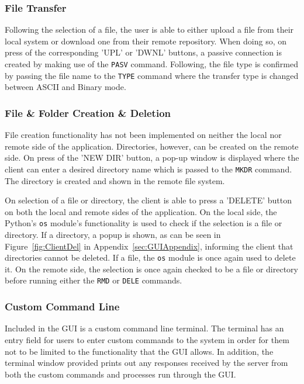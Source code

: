 \documentclass[10pt,twocolumn]{witseiepaper}
\begin{document}
\subsubsection*{File Transfer}
Following the selection of a file, the user is able to either upload a file from their local system or download one from their remote repository. When doing so, on press of the corresponding 'UPL' or 'DWNL' buttons, a passive connection is created by making use of the \texttt{PASV} command. Following, the file type is confirmed by passing the file name to the \texttt{TYPE} command where the transfer type is changed between ASCII and Binary mode.

\subsubsection*{File \& Folder Creation \& Deletion}
File creation functionality has not been implemented on neither the local nor remote side of the application. Directories, however, can be created on the remote side. On press of the 'NEW DIR' button, a pop-up window is displayed where the client can enter a desired directory name which is passed to the \texttt{MKDR} command. The directory is created and shown in the remote file system. 

On selection of a file or directory, the client is able to press a 'DELETE' button on both the local and remote sides of the application. On the local side, the Python's \texttt{os} module's functionality is used to check if the selection is a file or directory. If a directory, a popup is shown, as can be seen in Figure~\ref{fig:ClientDel} in Appendix~\ref{sec:GUIAppendix}, informing the client that directories cannot be deleted. If a file, the \texttt{os} module is once again used to delete it. On the remote side, the selection is once again checked to be a file or directory before running either the \texttt{RMD} or \texttt{DELE} commands.

\subsubsection*{Custom Command Line}
Included in the GUI is  a custom command line terminal. The terminal has an entry field for users to enter custom commands to the system in order for them not to be limited to the functionality that the GUI allows. In addition, the terminal window provided prints out any responses received by the server from both the custom commands and processes run through the GUI.
\end{document}
